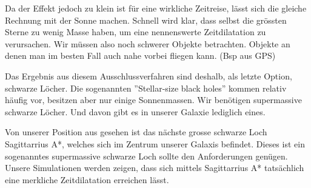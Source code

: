\begin{refsection}
    Da der Effekt jedoch zu klein ist für eine wirkliche Zeitreise, lässt sich die gleiche Rechnung mit der Sonne machen. Schnell wird klar, dass selbst die grössten Sterne zu wenig Masse haben, um eine nennenswerte Zeitdilatation zu verursachen. Wir müssen also noch schwerer Objekte betrachten. Objekte an denen man im besten Fall auch nahe vorbei fliegen kann. 
    (Bsp aus GPS)
     
    Das Ergebnis aus diesem Ausschlussverfahren sind deshalb, als letzte Option, schwarze Löcher. Die sogenannten ''Stellar-size black holes'' kommen relativ häufig vor, besitzen aber nur einige Sonnenmassen. Wir benötigen supermassive schwarze Löcher. Und davon gibt es in unserer Galaxie lediglich eines.
    
     Von unserer Position aus gesehen ist das nächste grosse schwarze Loch Sagittarrius A*, welches sich im Zentrum unserer Galaxis befindet. Dieses ist ein sogenanntes supermassive schwarze Loch sollte den Anforderungen genügen. Unsere Simulationen werden zeigen, dass sich mittels Sagittarrius A* tatsächlich eine merkliche Zeitdilatation erreichen lässt.
    

\end{refsection}
